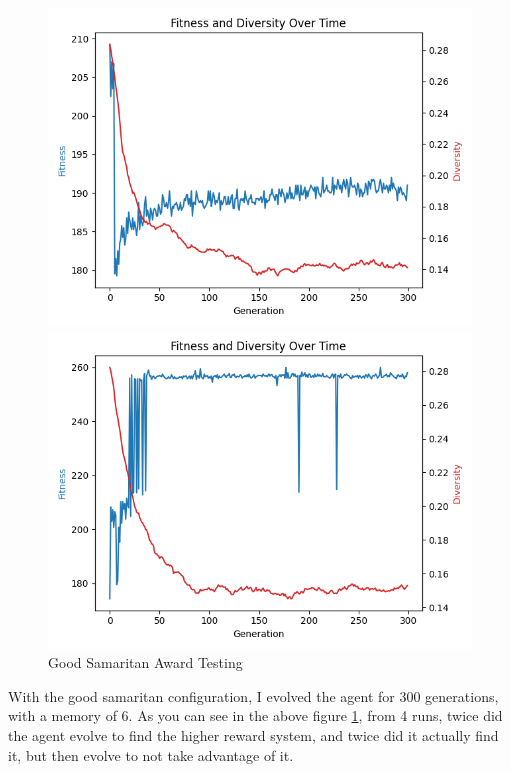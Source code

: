 \documentclass[11pt]{scrartcl} %
\begin{document}
\begin{figure}[H]
\begin{minipage}{0.45\textwidth}
        \includegraphics[width=\linewidth]{Figures/part_2/good_samaritan/plot_2025-03-11 19-31-27_2.png}
    \end{minipage}\hfill
    \begin{minipage}{0.45\textwidth}
        \centering
        \includegraphics[width=\linewidth]{Figures/part_2/good_samaritan/plot_2025-03-11 19-31-27_3.png}
    \end{minipage}
	\caption{Good Samaritan Award Testing}
	\label{fig:good_samaritan_award}
\end{figure}

With the good samaritan configuration, I evolved the agent for 300 generations, with a memory of 6.
As you can see in the above figure \ref{fig:good_samaritan_award}, from 4 runs, twice did the agent evolve to find the higher reward system, and twice did it actually find it, but then evolve to not take advantage of it.
\end{document}
